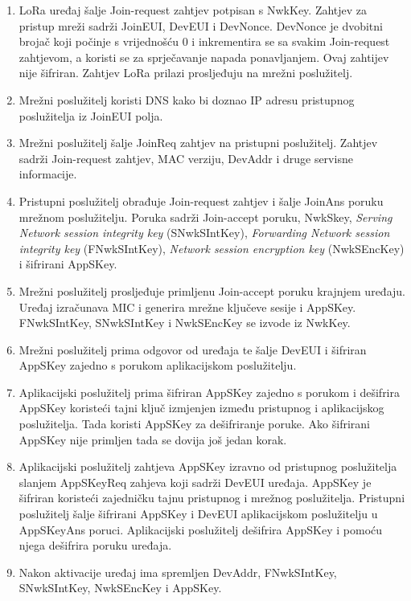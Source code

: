 \documentclass[times, utf8, diplomski]{fer}
\begin{document}
\begin{enumerate}
    \item LoRa uređaj šalje Join-request zahtjev potpisan s NwkKey. Zahtjev za pristup mreži sadrži JoinEUI, DevEUI i DevNonce. DevNonce je dvobitni brojač koji počinje s vrijednošću 0 i inkrementira se sa svakim Join-request zahtjevom, a koristi se za sprječavanje napada ponavljanjem. Ovaj zahtijev nije šifriran. Zahtjev LoRa prilazi prosljeđuju na mrežni poslužitelj.
    \item Mrežni poslužitelj koristi DNS kako bi doznao IP adresu pristupnog poslužitelja iz JoinEUI polja.
    \item Mrežni poslužitelj šalje JoinReq zahtjev na pristupni poslužitelj. Zahtjev sadrži Join-request zahtjev, MAC verziju, DevAddr i druge servisne informacije.
    \item Pristupni poslužitelj obrađuje Join-request zahtjev i šalje JoinAns poruku mrežnom poslužitelju. Poruka sadrži Join-accept poruku, NwkSkey, \emph{Serving Network session integrity key} (SNwkSIntKey), \emph{Forwarding Network session integrity key} (FNwkSIntKey), \emph{Network session encryption key} (NwkSEncKey) i šifrirani AppSKey.
    \item Mrežni poslužitelj prosljeđuje primljenu Join-accept poruku krajnjem uređaju. Uređaj izračunava MIC i generira mrežne ključeve sesije i AppSKey. FNwkSIntKey, SNwkSIntKey i NwkSEncKey se izvode iz NwkKey.
    \item Mrežni poslužitelj prima odgovor od uređaja te šalje DevEUI i šifriran AppSKey zajedno s porukom aplikacijskom poslužitelju. 
    \item Aplikacijski poslužitelj prima šifriran AppSKey zajedno s porukom i dešifrira AppSKey koristeći tajni ključ izmjenjen između pristupnog i aplikacijskog poslužitelja. Tada koristi AppSKey za dešifriranje poruke. Ako šifrirani AppSKey nije primljen tada se dovija još jedan korak.
    \item Aplikacijski poslužitelj zahtjeva AppSKey izravno od pristupnog poslužitelja slanjem AppSKeyReq zahjeva koji sadrži DevEUI uređaja. AppSKey je šifriran koristeći zajedničku tajnu pristupnog i mrežnog poslužitelja. Pristupni poslužitelj šalje šifrirani AppSKey i DevEUI aplikacijskom poslužitelju u AppSKeyAns poruci. Aplikacijski poslužitelj dešifrira AppSKey i pomoću njega dešifrira poruku uređaja.
    \item Nakon aktivacije uređaj ima spremljen DevAddr, FNwkSIntKey, SNwkSIntKey, NwkSEncKey i AppSKey\citep{LoRaWAN}.
\end{enumerate}
\end{document}
